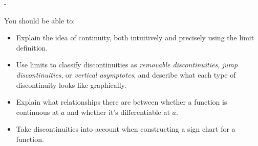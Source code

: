 \documentclass{article}
\makeatletter
\newlength{\tipmargin}
\renewenvironment{framed}{
  \setlength{\tipmargin}{\textwidth-\linewidth}
  \advance\@totalleftmargin-\tipmargin
  \def\FrameCommand{\hspace{\tipmargin}\fbox}%
  \advance\linewidth\tipmargin
  \MakeFramed {\advance\hsize-\width \FrameRestore}%
}
{\endMakeFramed}
\makeatother
\begin{document}

\begin{problemonly}
  \begin{framed}

You should be able to:
    \begin{itemize}[topsep=0pt,partopsep=0pt,parsep=8pt,itemsep=0pt]
    \item Explain the idea of continuity, both intuitively and precisely using the limit definition.

    \item Use limits to classify discontinuities as \emph{removable discontinuities}, \emph{jump discontinuities}, or \emph{vertical asymptotes}, and describe what each type of discontinuity looks like graphically.

    \item Explain what relationships there are between whether a function is continuous at $a$ and whether it's differentiable at $a$.

    \item Take discontinuities into account when constructing a sign chart for a function. 
    \end{itemize}
  \end{framed}
\end{problemonly}
\end{document}
